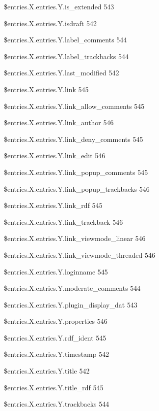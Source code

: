 \documentclass{book}
\renewcommand\subitem{\par}
\begin{document}
\begin{multicols}{2}
\begin{osp-index}
    \subitem \$entries.X.entries.Y.is\_extended\hspace{1mm} 543
    \subitem \$entries.X.entries.Y.isdraft\hspace{1mm} 542
    \subitem \$entries.X.entries.Y.label\_comments\hspace{1mm} 544
    \subitem \$entries.X.entries.Y.label\_trackbacks\hspace{1mm} 544
    \subitem \$entries.X.entries.Y.last\_modified\hspace{1mm} 542
    \subitem \$entries.X.entries.Y.link\hspace{1mm} 545
    \subitem \$entries.X.entries.Y.link\_allow\_comments\hspace{1mm} 
		545
    \subitem \$entries.X.entries.Y.link\_author\hspace{1mm} 546
    \subitem \$entries.X.entries.Y.link\_deny\_comments\hspace{1mm} 545
    \subitem \$entries.X.entries.Y.link\_edit\hspace{1mm} 546
    \subitem \$entries.X.entries.Y.link\_popup\_comments\hspace{1mm} 
		545
    \subitem \$entries.X.entries.Y.link\_popup\_trackbacks\hspace{1mm} 
		546
    \subitem \$entries.X.entries.Y.link\_rdf\hspace{1mm} 545
    \subitem \$entries.X.entries.Y.link\_trackback\hspace{1mm} 546
    \subitem \$entries.X.entries.Y.link\_viewmode\_linear\hspace{1mm} 
		546
    \subitem \$entries.X.entries.Y.link\_viewmode\_threaded\hspace{1mm} 
		546
    \subitem \$entries.X.entries.Y.loginname\hspace{1mm} 545
    \subitem \$entries.X.entries.Y.moderate\_comments\hspace{1mm} 544
    \subitem \$entries.X.entries.Y.plugin\_display\_dat\hspace{1mm} 543
    \subitem \$entries.X.entries.Y.properties\hspace{1mm} 546
    \subitem \$entries.X.entries.Y.rdf\_ident\hspace{1mm} 545
    \subitem \$entries.X.entries.Y.timestamp\hspace{1mm} 542
    \subitem \$entries.X.entries.Y.title\hspace{1mm} 542
    \subitem \$entries.X.entries.Y.title\_rdf\hspace{1mm} 545
    \subitem \$entries.X.entries.Y.trackbacks\hspace{1mm} 544

\end{osp-index}
\end{multicols}
\end{document}
